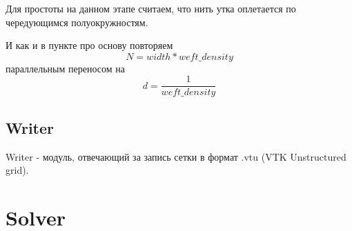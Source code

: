 Для простоты на данном этапе считаем, что нить утка оплетается по чередующимся полуокружностям.

И как и в пункте про основу повторяем
\[
    N = width * weft\_density
\]
параллельным переносом на
\[
    d = \frac{1}{weft\_density}
\]

\subsection*{Writer}
Writer - модуль, отвечающий за запись сетки в формат .vtu (VTK Unstructured grid).


\section*{Solver}
